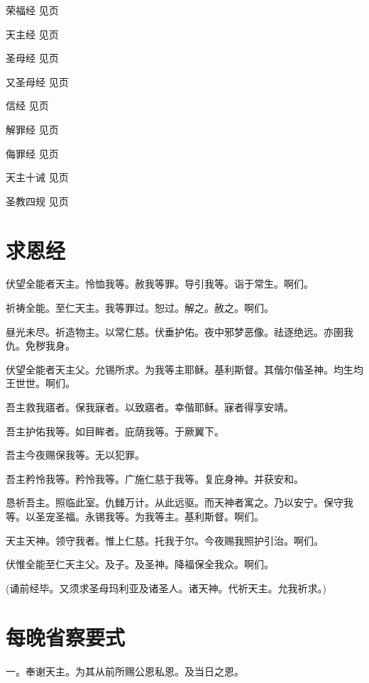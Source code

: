 \documentclass[UTF8,17pt]{ctexart}
\begin{document}
荣福经    \hfill   见\pageref{rong-fu-jing}页 

天主经    \hfill   见\pageref{tian-zhu-jing}页

圣母经    \hfill   见\pageref{sheng-mu-jing}页 

又圣母经  \hfill   见\pageref{you-sheng-mu-jing}页 

信经      \hfill   见\pageref{xin-jing}页

解罪经    \hfill   见\pageref{jie-zui-jing}页 

侮罪经    \hfill   见\pageref{hui-zui-jing}页 

天主十诫  \hfill   见\pageref{tian-zhu-shi-jie}页 

圣教四规  \hfill   见\pageref{sheng-jiao-si-gui}页

\section{求恩经}

伏望全能者天主。怜恤我等。赦我等罪。导引我等。诣于常生。啊们。

祈祷全能。至仁天主。我等罪过。恕过。解之。赦之。啊们。

昼光未尽。祈造物主。以常仁慈。伏垂护佑。夜中邪梦恶像。祛逐绝远。亦圉我仇。免秽我身。

伏望全能者天主父。允锡所求。为我等主耶稣。基利斯督。其偕尔偕圣神。均生均王世世。啊们。

吾主救我寤者。保我寐者。以致寤者。幸偕耶稣。寐者得享安靖。

吾主护佑我等。如目眸者。庇荫我等。于厥翼下。

吾主今夜赐保我等。无以犯罪。

吾主矜怜我等。矜怜我等。广施仁慈于我等。复庇身神。并获安和。

恳祈吾主。照临此室。仇雠万计。从此远驱。而天神者寓之。乃以安宁。保守我等。以圣宠圣福。永锡我等。为我等主。基利斯督。啊们。

天主天神。领守我者。惟上仁慈。托我于尔。今夜赐我照护引治。啊们。

伏惟全能至仁天主父。及子。及圣神。降福保全我众。啊们。

(诵前经毕。又须求圣母玛利亚及诸圣人。诸天神。代祈天主。允我祈求。)

\section{每晚省察要式}

⼀。奉谢天主。为其从前所赐公恩私恩。及当⽇之恩。
\end{document}
